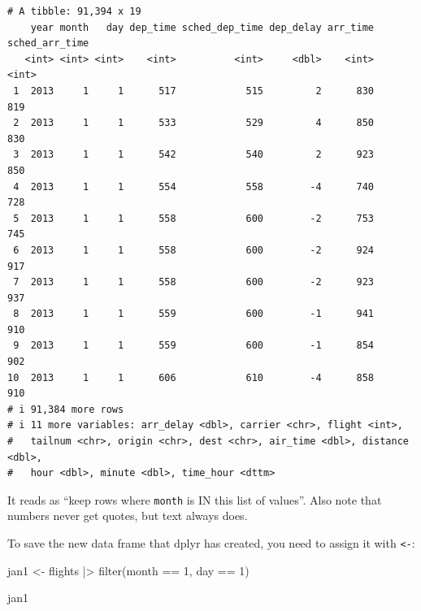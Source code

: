 \documentclass[
  letterpaper,
  DIV=11,
  numbers=noendperiod]{scrreprt}
\newenvironment{Shaded}{\begin{snugshade}}{\end{snugshade}}
\newcommand{\DecValTok}[1]{\textcolor[rgb]{0.68,0.00,0.00}{#1}}
\newcommand{\FunctionTok}[1]{\textcolor[rgb]{0.28,0.35,0.67}{#1}}
\newcommand{\NormalTok}[1]{\textcolor[rgb]{0.00,0.23,0.31}{#1}}
\newcommand{\OtherTok}[1]{\textcolor[rgb]{0.00,0.23,0.31}{#1}}
\newcommand{\SpecialCharTok}[1]{\textcolor[rgb]{0.37,0.37,0.37}{#1}}
\begin{document}
\begin{verbatim}
# A tibble: 91,394 x 19
    year month   day dep_time sched_dep_time dep_delay arr_time sched_arr_time
   <int> <int> <int>    <int>          <int>     <dbl>    <int>          <int>
 1  2013     1     1      517            515         2      830            819
 2  2013     1     1      533            529         4      850            830
 3  2013     1     1      542            540         2      923            850
 4  2013     1     1      554            558        -4      740            728
 5  2013     1     1      558            600        -2      753            745
 6  2013     1     1      558            600        -2      924            917
 7  2013     1     1      558            600        -2      923            937
 8  2013     1     1      559            600        -1      941            910
 9  2013     1     1      559            600        -1      854            902
10  2013     1     1      606            610        -4      858            910
# i 91,384 more rows
# i 11 more variables: arr_delay <dbl>, carrier <chr>, flight <int>,
#   tailnum <chr>, origin <chr>, dest <chr>, air_time <dbl>, distance <dbl>,
#   hour <dbl>, minute <dbl>, time_hour <dttm>
\end{verbatim}

It reads as ``keep rows where \texttt{month} is IN this list of
values''. Also note that numbers never get quotes, but text always does.

To save the new data frame that dplyr has created, you need to assign it
with \texttt{\textless{}-}:

\begin{Shaded}
\begin{Highlighting}[]
\NormalTok{jan1 }\OtherTok{\textless{}{-}}\NormalTok{ flights }\SpecialCharTok{|\textgreater{}}
  \FunctionTok{filter}\NormalTok{(month }\SpecialCharTok{==} \DecValTok{1}\NormalTok{, day }\SpecialCharTok{==} \DecValTok{1}\NormalTok{)}

\NormalTok{jan1}
\end{Highlighting}
\end{Shaded}
\end{document}
